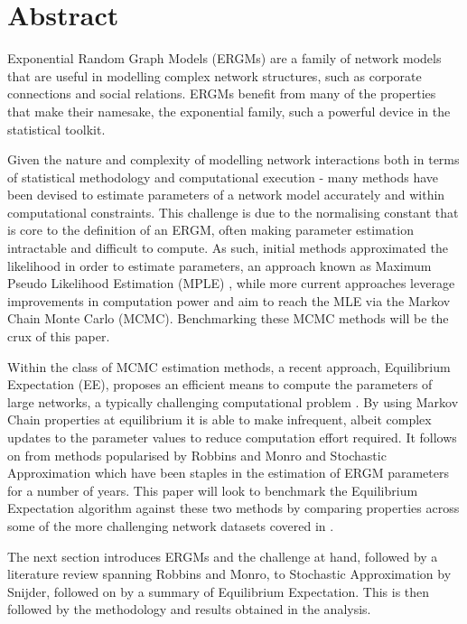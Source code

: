 \section{Abstract}
Exponential Random Graph Models (ERGMs) are a family of network models that are useful in modelling complex network structures, such as corporate connections and social relations. ERGMs benefit from many of the properties that make their namesake, the exponential family, such a powerful device in the statistical toolkit.

Given the nature and complexity of modelling network interactions both in terms of statistical methodology and computational execution - many methods have been devised to estimate parameters of a network model accurately and within computational constraints. This challenge is due to the normalising constant that is core to the definition of an ERGM, often making parameter estimation intractable and difficult to compute. As such, initial methods approximated the likelihood in order to estimate parameters, an approach known as Maximum Pseudo Likelihood Estimation (MPLE) \cite{straussikeda1990}, while more current approaches leverage improvements in computation power and aim to reach the MLE via the Markov Chain Monte Carlo (MCMC). Benchmarking these MCMC methods will be the crux of this paper.

Within the class of MCMC estimation methods, a recent approach, Equilibrium Expectation (EE), proposes an efficient means to compute the parameters of large networks, a typically challenging computational problem \cite{eqexpectation}. By using Markov Chain properties at equilibrium it is able to make infrequent, albeit complex updates to the parameter values to reduce computation effort required. It follows on from methods popularised by Robbins and Monro \cite{robbinsmonro1951} and Stochastic Approximation \cite{snijders2002} which have been staples in the estimation of ERGM parameters for a number of years. This paper will look to benchmark the Equilibrium Expectation algorithm against these two methods by comparing properties across some of the more challenging network datasets covered in \cite{hummels2012}.

The next section introduces ERGMs and the challenge at hand, followed by a literature review spanning Robbins and Monro, to Stochastic Approximation by Snijder, followed on by a summary of Equilibrium Expectation. This is then followed by the methodology and results obtained in the analysis. 
